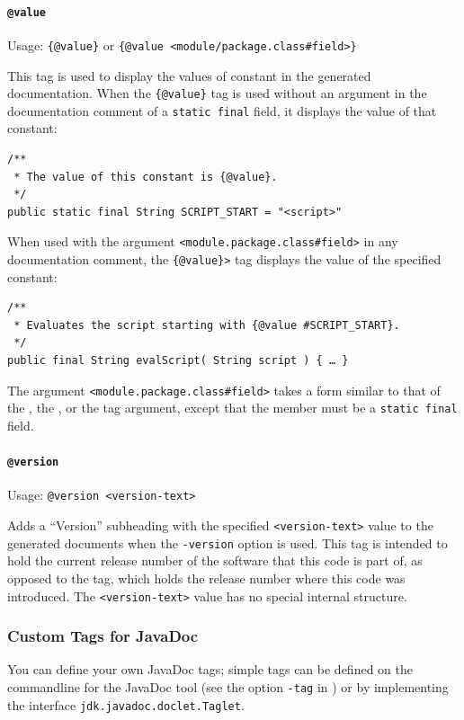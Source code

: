 \documentclass[11pt,a4paper, titlepage, parskip=half, headsepline, footsepline, cleardoublepage=current, headheight=1cm]{scrbook}
\begin{document}
\paragraph{\lstinline|@value|}\label{sec:TagValue}  Usage: \lstinline|{@value}| or \lstinline|{@value <module/package.class#field>}|

This tag is used to display the values of constant in the generated documentation. When the \lstinline|{@value}| tag is used without an argument in the documentation comment of a \lstinline|static final| field, it displays the value of that constant:
\begin{lstlisting}
/**
 * The value of this constant is {@value}.
 */
public static final String SCRIPT_START = "<script>"
\end{lstlisting}

When used with the argument \verb|<module.package.class#field>| in any documentation comment, the \lstinline|{@value}>| tag displays the value of the specified constant:
\begin{lstlisting}
/**
 * Evaluates the script starting with {@value #SCRIPT_START}.
 */
public final String evalScript( String script ) { … }
\end{lstlisting}
The argument \verb|<module.package.class#field>| takes a form similar to that of the , the , or the  tag argument, except that the member must be a \lstinline|static final| field.

\paragraph{\lstinline|@version|}\label{sec:TagVersion}  Usage: \lstinline|@version <version-text>|

Adds a “Version” subheading with the specified \verb#<version-text># value to the generated documents when the \verb#-version# option is used. This tag is intended to hold the current release number of the software that this code is part of, as opposed to the  tag, which holds the release number where this code was introduced. The \verb#<version-text># value has no special internal structure.

\subsubsection{Custom Tags for JavaDoc}\label{sec:CustomTagsForJavaDoc}
You can define your own JavaDoc tags; simple tags can be defined on the commandline for the JavaDoc tool (see the option \verb#-tag# in \autocite{ORACLE_DOC_JAVADOC_MAN:StandardDocletOptions}) or by implementing the interface \lstinline|jdk.javadoc.doclet.Taglet|\autocite{ORACLE_DOC_TAGLET_INTERFACE}.
\end{document}

